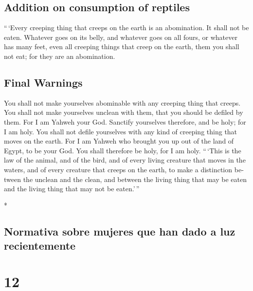 \begin{paracol}{2}
\begin{otherlanguage}{english}
\hypertarget{addition-on-consumption-of-reptiles}{%
\subsection{Addition on consumption of
reptiles}\label{addition-on-consumption-of-reptiles}}

 ``\,`Every creeping thing that creeps on the earth is an
abomination. It shall not be eaten.  Whatever goes on its
belly, and whatever goes on all fours, or whatever has many feet, even
all creeping things that creep on the earth, them you shall not eat; for
they are an abomination.

\hypertarget{final-warnings}{%
\subsection{Final Warnings}\label{final-warnings}}

 You shall not make yourselves abominable with any
creeping thing that creeps. You shall not make yourselves unclean with
them, that you should be defiled by them.  For I am
Yahweh your God. Sanctify yourselves therefore, and be holy; for I am
holy. You shall not defile yourselves with any kind of creeping thing
that moves on the earth.  For I am Yahweh who brought you
up out of the land of Egypt, to be your God. You shall therefore be
holy, for I am holy.  ``\,`This is the law of the animal,
and of the bird, and of every living creature that moves in the waters,
and of every creature that creeps on the earth,  to make
a distinction between the unclean and the clean, and between the living
thing that may be eaten and the living thing that may not be eaten.'\,''

\end{otherlanguage}

\switchcolumn[0]*

\hypertarget{normativa-sobre-mujeres-que-han-dado-a-luz-recientemente}{%
\subsection{Normativa sobre mujeres que han dado a luz
recientemente}\label{normativa-sobre-mujeres-que-han-dado-a-luz-recientemente}}

\hypertarget{section-22}{%
\section{12}\label{section-22}}


\end{paracol}
